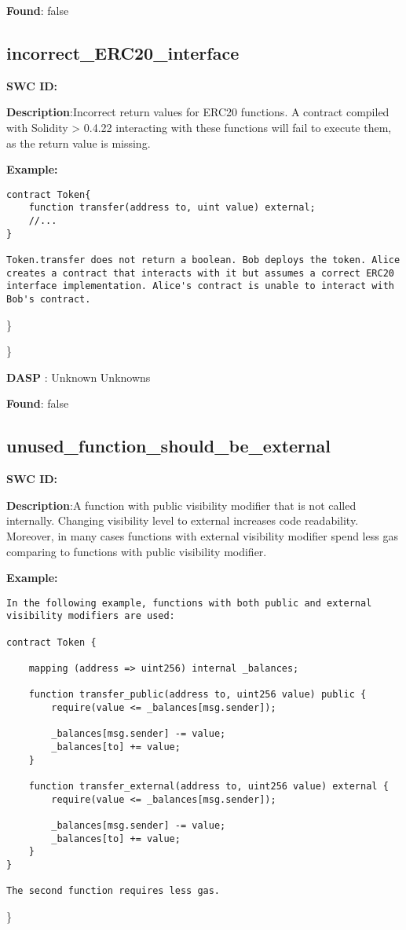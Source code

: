 \documentclass{article}
\begin{document}
\textbf{Found}: false

\subsection{incorrect\_ERC20\_interface} 
\textbf{SWC \textunderscore ID:} 

\textbf{Description}:Incorrect return values for ERC20 functions. A contract compiled with Solidity > 0.4.22 interacting with these functions will fail to execute them, as the return value is missing.


\textbf{Example:} 
\begin{verbatim}
contract Token{
    function transfer(address to, uint value) external;
    //...
}

Token.transfer does not return a boolean. Bob deploys the token. Alice creates a contract that interacts with it but assumes a correct ERC20 interface implementation. Alice's contract is unable to interact with Bob's contract.

\end{verbatim}\} 

\} 

\textbf{DASP} : Unknown Unknowns

\textbf{Found}: false

\subsection{unused\_function\_should\_be\_external} 
\textbf{SWC \textunderscore ID:} 

\textbf{Description}:A function with public visibility modifier that is not called internally. Changing visibility level to external increases code readability. Moreover, in many cases functions with external visibility modifier spend less gas comparing to functions with public visibility modifier.


\textbf{Example:} 
\begin{verbatim}
In the following example, functions with both public and external visibility modifiers are used:

contract Token {

    mapping (address => uint256) internal _balances;

    function transfer_public(address to, uint256 value) public {
        require(value <= _balances[msg.sender]);

        _balances[msg.sender] -= value;
        _balances[to] += value;
    }

    function transfer_external(address to, uint256 value) external {
        require(value <= _balances[msg.sender]);

        _balances[msg.sender] -= value;
        _balances[to] += value;
    }
}

The second function requires less gas.

\end{verbatim}\} 
\end{document}
